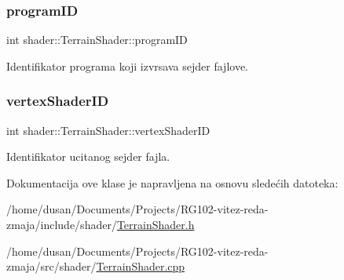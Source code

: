 \subsubsection{\texorpdfstring{program\+ID}{programID}}
{\footnotesize\ttfamily int shader\+::\+Terrain\+Shader\+::program\+ID\hspace{0.3cm}{\ttfamily [private]}}



Identifikator programa koji izvrsava sejder fajlove. 

\mbox{\label{classshader_1_1TerrainShader_a5f65bb56d6c39b58e79488d2d4409396}} 
\subsubsection{\texorpdfstring{vertex\+Shader\+ID}{vertexShaderID}}
{\footnotesize\ttfamily int shader\+::\+Terrain\+Shader\+::vertex\+Shader\+ID\hspace{0.3cm}{\ttfamily [private]}}



Identifikator ucitanog sejder fajla. 



Dokumentacija ove klase je napravljena na osnovu sledećih datoteka\+:\begin{DoxyCompactItemize}
\item 
/home/dusan/\+Documents/\+Projects/\+R\+G102-\/vitez-\/reda-\/zmaja/include/shader/\hyperlink{TerrainShader_8h}{Terrain\+Shader.\+h}\item 
/home/dusan/\+Documents/\+Projects/\+R\+G102-\/vitez-\/reda-\/zmaja/src/shader/\hyperlink{TerrainShader_8cpp}{Terrain\+Shader.\+cpp}\end{DoxyCompactItemize}
